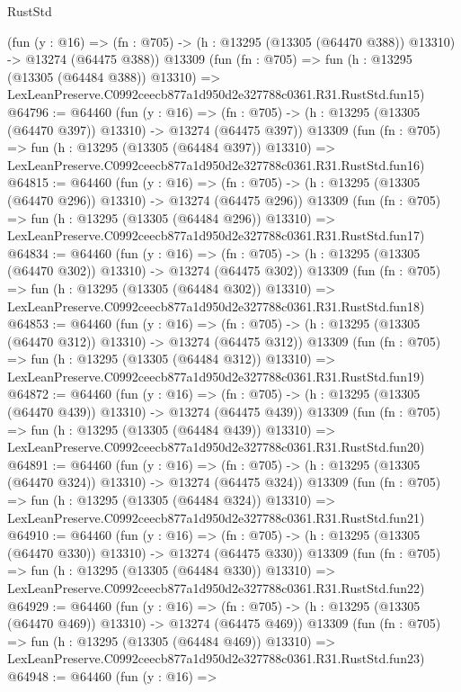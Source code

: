 \begin{lexlean}{RustStd}
\begin{coremodule}
    (fun (y : @16) =>
    (fn : @705) -> (h : @13295 (@13305 (@64470 @388)) @13310) -> @13274 (@64475 @388))
    @13309
    (fun (fn : @705) =>
    fun (h : @13295 (@13305 (@64484 @388)) @13310) =>
    LexLeanPreserve.C0992ceecb877a1d950d2e327788c0361.R31.RustStd.fun15)
@64796 := @64460
    (fun (y : @16) =>
    (fn : @705) -> (h : @13295 (@13305 (@64470 @397)) @13310) -> @13274 (@64475 @397))
    @13309
    (fun (fn : @705) =>
    fun (h : @13295 (@13305 (@64484 @397)) @13310) =>
    LexLeanPreserve.C0992ceecb877a1d950d2e327788c0361.R31.RustStd.fun16)
@64815 := @64460
    (fun (y : @16) =>
    (fn : @705) -> (h : @13295 (@13305 (@64470 @296)) @13310) -> @13274 (@64475 @296))
    @13309
    (fun (fn : @705) =>
    fun (h : @13295 (@13305 (@64484 @296)) @13310) =>
    LexLeanPreserve.C0992ceecb877a1d950d2e327788c0361.R31.RustStd.fun17)
@64834 := @64460
    (fun (y : @16) =>
    (fn : @705) -> (h : @13295 (@13305 (@64470 @302)) @13310) -> @13274 (@64475 @302))
    @13309
    (fun (fn : @705) =>
    fun (h : @13295 (@13305 (@64484 @302)) @13310) =>
    LexLeanPreserve.C0992ceecb877a1d950d2e327788c0361.R31.RustStd.fun18)
@64853 := @64460
    (fun (y : @16) =>
    (fn : @705) -> (h : @13295 (@13305 (@64470 @312)) @13310) -> @13274 (@64475 @312))
    @13309
    (fun (fn : @705) =>
    fun (h : @13295 (@13305 (@64484 @312)) @13310) =>
    LexLeanPreserve.C0992ceecb877a1d950d2e327788c0361.R31.RustStd.fun19)
@64872 := @64460
    (fun (y : @16) =>
    (fn : @705) -> (h : @13295 (@13305 (@64470 @439)) @13310) -> @13274 (@64475 @439))
    @13309
    (fun (fn : @705) =>
    fun (h : @13295 (@13305 (@64484 @439)) @13310) =>
    LexLeanPreserve.C0992ceecb877a1d950d2e327788c0361.R31.RustStd.fun20)
@64891 := @64460
    (fun (y : @16) =>
    (fn : @705) -> (h : @13295 (@13305 (@64470 @324)) @13310) -> @13274 (@64475 @324))
    @13309
    (fun (fn : @705) =>
    fun (h : @13295 (@13305 (@64484 @324)) @13310) =>
    LexLeanPreserve.C0992ceecb877a1d950d2e327788c0361.R31.RustStd.fun21)
@64910 := @64460
    (fun (y : @16) =>
    (fn : @705) -> (h : @13295 (@13305 (@64470 @330)) @13310) -> @13274 (@64475 @330))
    @13309
    (fun (fn : @705) =>
    fun (h : @13295 (@13305 (@64484 @330)) @13310) =>
    LexLeanPreserve.C0992ceecb877a1d950d2e327788c0361.R31.RustStd.fun22)
@64929 := @64460
    (fun (y : @16) =>
    (fn : @705) -> (h : @13295 (@13305 (@64470 @469)) @13310) -> @13274 (@64475 @469))
    @13309
    (fun (fn : @705) =>
    fun (h : @13295 (@13305 (@64484 @469)) @13310) =>
    LexLeanPreserve.C0992ceecb877a1d950d2e327788c0361.R31.RustStd.fun23)
@64948 := @64460
    (fun (y : @16) =>

\end{coremodule}
\end{lexlean}

